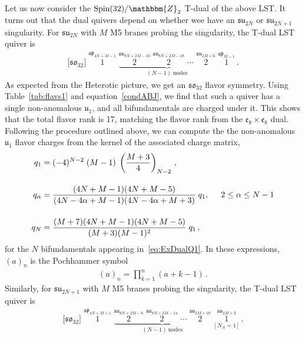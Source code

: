 \documentclass[11pt]{article}
\numberwithin{equation}{section}
\newcommand{\fu}{\mathfrak{u}}
\newcommand{\fsu}{\mathfrak{su}}
\begin{document}
Let us now consider the $\text{Spin}(32)/\mathbbm{Z}_2$ T-dual of the above LST. It turns out that the dual quivers depend on whether wee have an $\fsu_{2N}$ or $\fsu_{2N+1}$ singularity. For $\fsu_{2N}$ with $M$ M5 branes probing the singularity, the T-dual LST quiver is
\begin{align}
\label{eq:ExDualQ1}
\lbrack  \mathfrak{so}_{32}\rbrack    \, \,   
{\overset{\mathfrak{sp}_{4N+M-1}}{1}}   \, \,   
\underbrace{{\overset{\mathfrak{su}_{8N+2M-10}}{2}} \, \, 
{\overset{\mathfrak{su}_{8N+2M-18}}{2}} \, \,
\cdots \, \,
{\overset{\mathfrak{su}_{2M+6}}{2}}}_{(N-1) \text{~nodes}} \, \,
{\overset{\mathfrak{sp}_{M-1}}{1}} \,.
\end{align}
As expected from the Heterotic picture, we get an $\mathfrak{so}_{32}$ flavor symmetry. Using Table~\ref{tab:flavs1} and equation~\eqref{condABJ}, we find that such a quiver has a single non-anomalous $\fu_1$, and all bifundamentals are charged under it. This shows that the total flavor rank is 17, matching the flavor rank from the $\mathfrak{e}_{8} \times \mathfrak{e}_{8}$ dual. Following the procedure outlined above, we can compute the the non-anomalous $\fu_1$ flavor charges from the kernel of the associated charge matrix,
\begin{align}
\begin{split}
q_{1}&=(-4)^{N-2}\;(M-1)\;\left(\frac{M+3}{4}\right)_{N-2}\,, \\[10pt]
q_{\alpha}&=\frac{(4N+M-1)(4N+M-5)}{(4N-4\alpha+M-1)(4N-4\alpha+M+3)}\;q_{1}, \hspace{0.5cm} 2 \leq \alpha \leq N-1  \\[12pt]
q_{N}&=\frac{(M+7)(4N+M-1)(4N+M-5)}{(M+3)(M-1)^{2}}\;q_{1}\,,
\end{split}
\end{align}
for the $N$ bifundamentals appearing in~\eqref{eq:ExDualQ1}. In these expressions, $(a)_{n}$ is the Pochhammer symbol
\begin{align}
    (a)_{n}=\prod_{k=1}^{n}(a+k-1) \, .
\end{align}
Similarly, for  $\mathfrak{su}_{2N+1}$ with $M$ M5 branes probing the singularity, the T-dual LST quiver is
\begin{align}
\lbrack  \mathfrak{so}_{32}\rbrack    \, \,   
{\overset{\mathfrak{sp}_{4N+M+1}}{1}}   \, \,   
\underbrace{{\overset{\mathfrak{su}_{8N+2M-6}}{2}} \, \, 
{\overset{\mathfrak{su}_{8N+2M-14}}{2}} \, \,
\cdots \, \,
{\overset{\mathfrak{su}_{2M+10}}{2}}}_{(N-1)~\text{nodes}} \, \,
\underset{{\left[N_{A}=1\right]}}
{\overset{\mathfrak{su}_{2M+2}}{1}} \,.
\end{align}
\end{document}
